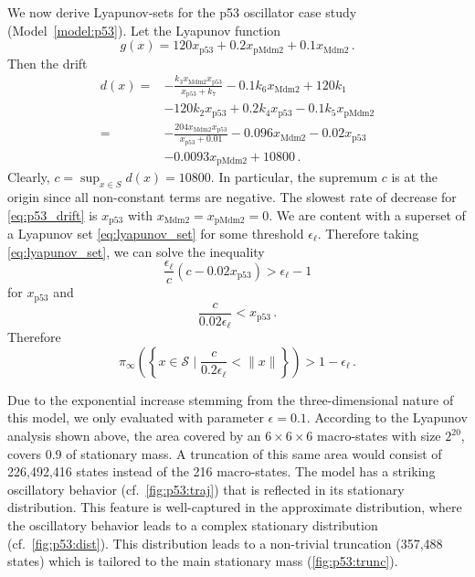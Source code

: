 We now derive Lyapunov-sets for the p53 oscillator case study (Model~\ref{model:p53}). Let the Lyapunov function
\begin{equation}
    g(x) = 120 x_{\mathrm{p53}} + 0.2 x_{\mathrm{pMdm2}} + 0.1 x_{\mathrm{Mdm2}}\,.
\end{equation}
Then the drift
\begin{align}
    d(x) = & - \frac{k_3 x_{\mathrm{Mdm2}} x_{\mathrm{p53}}}{x_{\mathrm{p53}} + k_7}
            - 0.1 k_6 x_{\mathrm{Mdm2}}
            + 120 k_1 \nonumber\\
          & - 120 k_2 x_{\mathrm{p53}}
            + 0.2 k_4 x_{\mathrm{p53}}
            - 0.1 k_5 x_{\mathrm{pMdm2}} \nonumber \\
        = & - \frac{204 x_{\mathrm{Mdm2}} x_{\mathrm{p53}}}{x_{\mathrm{p53}} + 0.01}
            - 0.096 x_{\mathrm{Mdm2}}
            - 0.02 x_{\mathrm{p53}} \nonumber\\
            &- 0.0093 x_{\mathrm{pMdm2}}
            + 10800\,. \label{eq:p53_drift}
\end{align}
Clearly, $c = \sup_{x\in{S}} d(x) = 10800$.
In particular, the supremum $c$ is at the origin since all non-constant terms are negative.
The slowest rate of decrease for \eqref{eq:p53_drift} is $x_{\mathrm{p53}}$ with $x_{\mathrm{Mdm2}} = x_{\mathrm{pMdm2}} = 0$.
We are content with a superset of a Lyapunov set \eqref{eq:lyapunov_set} for some threshold $\epsilon_{\ell}$.
Therefore taking \eqref{eq:lyapunov_set}, we can solve the inequality
$$
\frac{\epsilon_{\ell}}{c}(c - 0.02 x_{\mathrm{p53}}) > \epsilon_{\ell} - 1
$$
for $x_{\mathrm{p53}}$ and 
\begin{equation}
    \frac{c}{0.02 \epsilon_{\ell}} < x_{\mathrm{p53}}\,.
\end{equation}
Therefore
\begin{equation}
\pi_{\infty}\left(\left\{x\in\mathcal{S} \mid \frac{c}{0.2\epsilon_{\ell}} < \lVert x \rVert \right\}\right) > 1 - \epsilon_{\ell}\,.
\end{equation}

Due to the exponential increase stemming from the three-dimension\-al nature of this model, we only evaluated with parameter $\epsilon=0.1$.
According to the Lyapunov analysis shown above, the area covered by an $6\times 6\times 6$ macro-states with size $2^{20}$, covers 0.9 of stationary mass.
A truncation of this same area would consist of 226,492,416 states instead of the 216 macro-states.
The model has a striking oscillatory behavior (cf.\ \autoref{fig:p53:traj}) that is reflected in its stationary distribution.
This feature is well-captured in the approximate distribution, where the oscillatory behavior leads to a complex stationary distribution (cf.\ \autoref{fig:p53:dist}).
This distribution leads to a non-trivial truncation (357,488 states) which is tailored to the main stationary mass (\autoref{fig:p53:trunc}).


